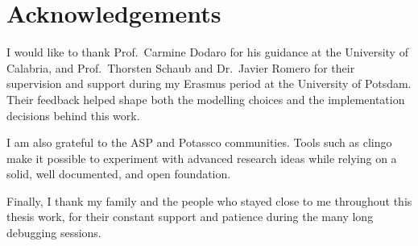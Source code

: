 \section*{Acknowledgements}

I would like to thank Prof.~Carmine Dodaro for his guidance at the University of Calabria, and Prof.~Thorsten Schaub and Dr.~Javier Romero for their supervision and support during my Erasmus period at the University of Potsdam. Their feedback helped shape both the modelling choices and the implementation decisions behind this work.

I am also grateful to the ASP and Potassco communities. Tools such as clingo make it possible to experiment with advanced research ideas while relying on a solid, well documented, and open foundation.

Finally, I thank my family and the people who stayed close to me throughout this thesis work, for their constant support and patience during the many long debugging sessions.
